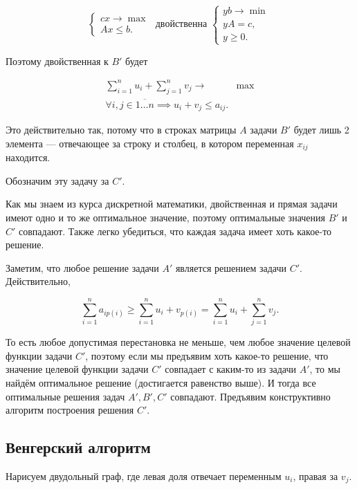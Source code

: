 \documentclass[a4paper, 12pt]{article}
\begin{document}
\[
  \begin{cases}
    cx \to \max\\
    Ax \leqslant b.
  \end{cases}
  \text{ двойственна }
  \begin{cases}
    yb \to \min\\
    yA = c,\\
    y \geqslant 0.
  \end{cases}
\]

Поэтому двойственная к $B'$ будет

\begin{align*}
  \sum\limits_{i = 1}^n u_i + \sum\limits_{j = 1}^n v_j \to &\max\\
  \forall i, j \in \overline{1\ldots n} \implies u_i + v_j \leqslant a_{ij}.
\end{align*}

Это действительно так, потому что в строках матрицы $A$ задачи $B'$ будет лишь
2 элемента --- отвечающее за строку и столбец, в котором переменная $x_{ij}$
находится.

Обозначим эту задачу за $C'$.

Как мы знаем из курса дискретной математики, двойственная и прямая задачи
имеют одно и то же оптимальное значение, поэтому оптимальные значения $B'$ и $C'$
совпадают. Также легко убедиться, что каждая задача имеет хоть какое-то
решение.

Заметим, что любое решение задачи $A'$ является решением задачи $C'$. Действительно,

\begin{equation}\label{main}
  \sum\limits_{i = 1}^n a_{ip(i)} \geqslant \sum\limits_{i = 1}^n u_i + v_{p(i)} =
  \sum\limits_{i = 1}^n u_i + \sum\limits_{j = 1}^n v_j.
\end{equation}

То есть любое допустимая перестановка не меньше, чем любое значение целевой
функции задачи $C'$, поэтому если мы предъявим хоть какое-то решение, что 
значение целевой функции задачи $C'$ совпадает с каким-то из задачи $A'$, то мы найдём
оптимальное решение (достигается равенство выше). И тогда все оптимальные решения
задач $A', B', C'$ совпадают. Предъявим конструктивно алгоритм построения решения
$C'$.

\subsection{Венгерский алгоритм}

Нарисуем двудольный граф, где левая доля отвечает переменным $u_i$, правая
за $v_j$. 
\end{document}
